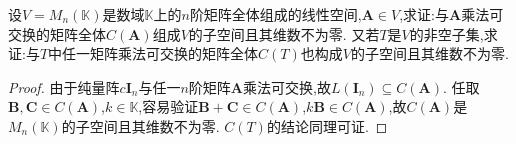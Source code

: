\documentclass[../../main.tex]{subfiles}%
\begin{document}
\begin{example}\label{example:矩阵乘法可交换的子空间C(A)}
设\(V = M_n(\mathbb{K})\)是数域\(\mathbb{K}\)上的\(n\)阶矩阵全体组成的线性空间,\(\boldsymbol{A}\in V\),求证:与\(\boldsymbol{A}\)乘法可交换的矩阵全体\(C(\boldsymbol{A})\)组成\(V\)的子空间且其维数不为零. 又若\(T\)是\(V\)的非空子集,求证:与\(T\)中任一矩阵乘法可交换的矩阵全体\(C(T)\)也构成\(V\)的子空间且其维数不为零.
\end{example}
\begin{proof}

由于纯量阵\(c\boldsymbol{I}_n\)与任一\(n\)阶矩阵\(\boldsymbol{A}\)乘法可交换,故\(L(\boldsymbol{I}_n)\subseteq C(\boldsymbol{A})\). 任取\(\boldsymbol{B},\boldsymbol{C}\in C(\boldsymbol{A})\),\(k\in\mathbb{K}\),容易验证\(\boldsymbol{B}+\boldsymbol{C}\in C(\boldsymbol{A})\),\(k\boldsymbol{B}\in C(\boldsymbol{A})\),故\(C(\boldsymbol{A})\)是\(M_n(\mathbb{K})\)的子空间且其维数不为零. \(C(T)\)的结论同理可证.

\end{proof}
\end{document}
